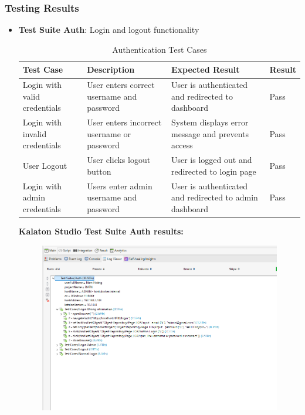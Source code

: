 \subsubsection{Testing Results}
\begin{itemize}
  \item \textbf{Test Suite Auth}: Login and logout functionality
  \begin{table}[H]
    \centering
    \caption{Authentication Test Cases}
    \begin{tabular}{|p{4cm}|p{5cm}|p{4cm}|p{1cm}|}
    \hline
    \textbf{Test Case} & \textbf{Description} & \textbf{Expected Result} & \textbf{Result} \\
    \hline
    Login with valid credentials & User enters correct username and password & User is authenticated and redirected to dashboard & Pass \\
    \hline
    Login with invalid credentials & User enters incorrect username or password & System displays error message and prevents access & Pass \\
    \hline
    User Logout &   User clicks logout button & User is logged out and redirected to login page & Pass \\
    \hline
    Login with admin credentials & Users enter admin username and password & User is authenticated and redirected to admin dashboard & Pass \\
    \hline
    \end{tabular}
    \label{tab:auth_tests}
  \end{table}
  \textbf{Kalaton Studio Test Suite Auth results:} 
  \begin{figure}[H]
    \centering
    \includegraphics[width=15cm]{graphics/chapter6/test_suite_auth.png}

\end{figure}
\end{itemize}
